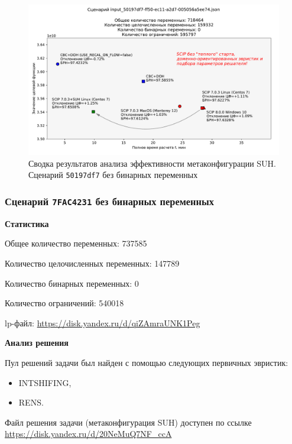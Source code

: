 \documentclass[%
	11pt,
	a4paper,
	utf8,
		]{article}
\begin{document}
\begin{figure}[!h]
	\centering
	\includegraphics[scale=0.6]{figures/summary_50197df7.pdf}
	\caption{Сводка результатов анализа эффективности метаконфигурации SUH. \\Сценарий \texttt{50197df7} без бинарных переменных}\label{fig:summary_50197df7}
\end{figure}

\subsubsection{Сценарий \texttt{7FAC4231} без бинарных переменных}

\textbf{Статистика}\vspace*{1mm}

Общее количество переменных: 737585

Количество целочисленных переменных: 147789

Количество бинарных переменных: 0

Количество ограничений: 540018

lp-файл: \url{https://disk.yandex.ru/d/qiZAmraUNK1Peg}

\vspace*{5mm}\textbf{Анализ решения}\vspace*{1mm}

Пул решений задачи был найден с помощью следующих первичных эвристик:
\begin{itemize}
	\item INTSHIFING,
	
	\item RENS.
\end{itemize}

Файл решения задачи (метаконфигурация SUH) доступен по ссылке \url{https://disk.yandex.ru/d/20NeMuQ7NF_ccA}
\end{document}
